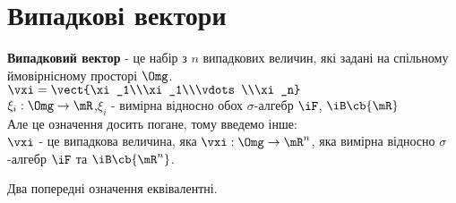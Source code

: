 \section{Випадкові вектори}
\textbf{Випадковий вектор} - це набір з $n$ випадкових величин, які задані на спільному ймовірнісному просторі $\Omg$.  \\
$\vxi = \vect{\xi_1\\\xi_1\\\vdots\\\xi_n}$\\
$\xi_i:\Omg\to\mR$,$\xi_i$ - вимірна відносно обох $\sigma$-алгебр $\iF$, $\iB\cb{\mR}$\\
Але це означення досить погане, тому введемо інше:\\
$\vxi$ - це випадкова величина, яка $\vxi:\Omg\to\mR^n$, яка вимірна відносно $\sigma$-алгебр $\iF$ та $\iB\cb{\mR^n}$. \\
\begin{teor}
Два попередні означення еквівалентні.
\end{teor}

